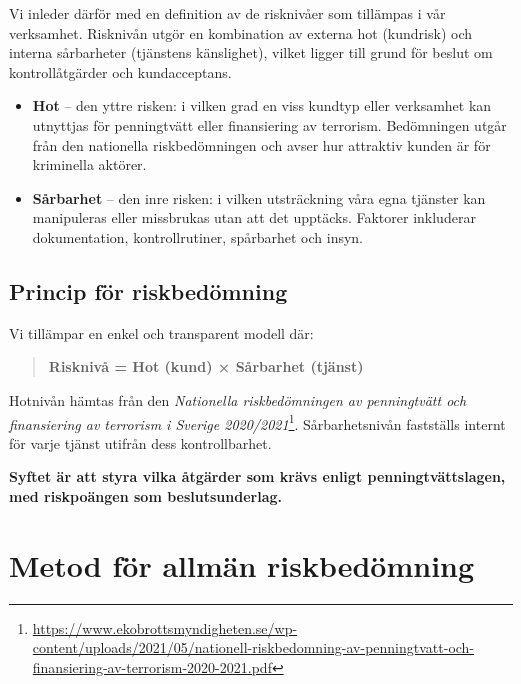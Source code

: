 \documentclass{article}
\begin{document}
Vi inleder därför med en definition av de risknivåer som tillämpas i vår verksamhet. Risknivån utgör en kombination av externa hot (kundrisk) och interna sårbarheter (tjänstens känslighet), vilket ligger till grund för beslut om kontrollåtgärder och kundacceptans.

\begin{itemize}[label=--]
  \item \textbf{Hot} – den yttre risken: i vilken grad en viss kundtyp eller verksamhet kan utnyttjas för penningtvätt eller finansiering av terrorism. Bedömningen utgår från den nationella riskbedömningen och avser hur attraktiv kunden är för kriminella aktörer.

  \item \textbf{Sårbarhet} – den inre risken: i vilken utsträckning våra egna tjänster kan manipuleras eller missbrukas utan att det upptäcks. Faktorer inkluderar dokumentation, kontrollrutiner, spårbarhet och insyn.
\end{itemize}

\subsection*{Princip för riskbedömning}

Vi tillämpar en enkel och transparent modell där:

\begin{quote}
\textbf{Risknivå = Hot (kund) × Sårbarhet (tjänst)}
\end{quote}

Hotnivån hämtas från den \textit{Nationella riskbedömningen av penningtvätt och finansiering av terrorism i Sverige 2020/2021}\footnote{\url{https://www.ekobrottsmyndigheten.se/wp-content/uploads/2021/05/nationell-riskbedomning-av-penningtvatt-och-finansiering-av-terrorism-2020-2021.pdf}}. Sårbarhetsnivån fastställs internt för varje tjänst utifrån dess kontrollbarhet.

\textbf{Syftet är att styra vilka åtgärder som krävs enligt penningtvättslagen, med riskpoängen som beslutsunderlag.}


\vspace{3em}


\section*{Metod för allmän riskbedömning}
\end{document}

